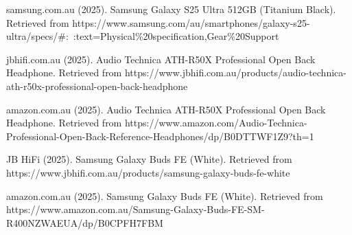 \documentclass[a4paper,12pt]{article}
\begin{document}
\begin{thebibliography}{99}
samsung.com.au (2025).
Samsung Galaxy S25 Ultra 512GB (Titanium Black).
Retrieved from https://www.samsung.com/au/smartphones/galaxy-s25-ultra/specs/\#:~:text=Physical\%20specification,Gear\%20Support

jbhifi.com.au (2025).
Audio Technica ATH-R50X Professional Open Back Headphone.
Retrieved from https://www.jbhifi.com.au/products/audio-technica-ath-r50x-professional-open-back-headphone

amazon.com.au (2025).
Audio Technica ATH-R50X Professional Open Back Headphone.
Retrieved from https://www.amazon.com/Audio-Technica-Professional-Open-Back-Reference-Headphones/dp/B0DTTWF1Z9?th=1

JB HiFi (2025).
Samsung Galaxy Buds FE (White).
Retrieved from https://www.jbhifi.com.au/products/samsung-galaxy-buds-fe-white

amazon.com.au (2025).
Samsung Galaxy Buds FE (White).
Retrieved from https://www.amazon.com.au/Samsung-Galaxy-Buds-FE-SM-R400NZWAEUA/dp/B0CPFH7FBM

\end{thebibliography}
\end{document}
